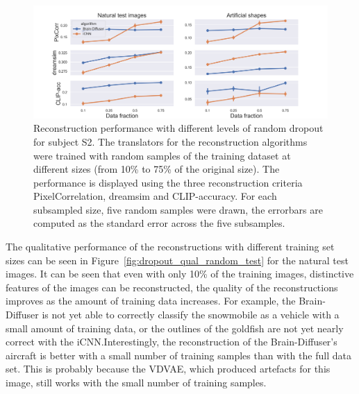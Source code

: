 \begin{figure}[ht]
  \centering
  \includegraphics[width=1\textwidth]{plots/dropout_random_reconstruction.png}
  \caption[Reconstruction Performance with increasing dropout]{Reconstruction performance with different levels of random dropout for subject S2. The translators for the reconstruction algorithms were trained with random samples of the training dataset at different sizes (from 10\% to 75\% of the original size). The performance is displayed using the three reconstruction criteria PixelCorrelation, dreamsim and CLIP-accuracy. For each subsampled size, five random samples were drawn, the errorbars are computed as the standard error across the five subsamples.}\label{fig:dropout_random_reconstruction}
\end{figure}

The qualitative performance of the reconstructions with different training set sizes can be seen in Figure~\ref{fig:dropout_qual_random_test} for the natural test images. It can be seen that even with only 10\% of the training images, distinctive features of the images can be reconstructed,  the quality of the reconstructions improves as the amount of training data increases. For example, the Brain-Diffuser is not yet able to correctly classify the snowmobile as a vehicle with a small amount of training data, or the outlines of the goldfish are not yet nearly correct with the iCNN.\@ Interestingly, the reconstruction of the Brain-Diffuser's aircraft is better with a small number of training samples than with the full data set. This is probably because the VDVAE, which produced artefacts for this image, still works with the small number of training samples. 


